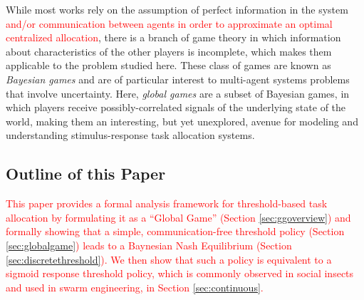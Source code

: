 \documentclass[smallextended]{svjour3}       %
\newcommand{\edit}[1]{\textcolor{red}{#1}}
\begin{document}
While most works rely on the assumption of perfect information in the system \edit{and/or communication between agents in order to approximate an optimal centralized allocation}, there is a branch of game theory in which information about characteristics of the other players is incomplete, which makes them applicable to the problem studied here. These class of games are known as \emph{Bayesian games} \citep{harsanyi2004games} and are of particular interest to multi-agent systems problems that involve uncertainty. Here, \emph{global games} \citep{Carlsson1993} are a subset of Bayesian games, in which players receive possibly-correlated signals of the underlying state of the world, making them an interesting, but yet unexplored, avenue for modeling and understanding stimulus-response task allocation systems. 

\subsection{Outline of this Paper}
\edit{This paper provides a formal analysis framework for threshold-based task allocation by formulating it as a ``Global Game'' (Section \ref{sec:ggoverview}) and formally showing that a simple, communication-free threshold policy (Section \ref{sec:globalgame}) leads to a Baynesian Nash Equilibrium (Section \ref{sec:discretethreshold}). We then show that such a policy is equivalent to a sigmoid response threshold policy, which is commonly observed in social insects and used in swarm engineering, in Section \ref{sec:continuous}.}

\end{document}

